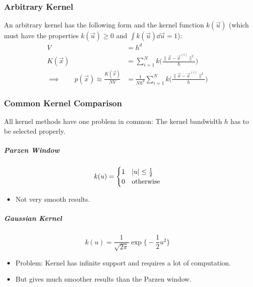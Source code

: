 \subsubsection{Arbitrary Kernel}
	An arbitrary kernel has the following form and the kernel function \( k(\vec{u}) \) (which must have the properties \( k(\vec{u}) \geq 0 \) and \( \int k(\vec{u}) \dd{\vec{u}} = 1 \)):
	\begin{align}
		V                                                       & = h^d                                                                                              \\
		K(\vec{x})                                              & = \sum_{i = 1}^{N} k\Bigg( \frac{\lVert \vec{x} - \vec{x}^{(i)} \rVert^2}{h} \Bigg)                \\
		\implies\qquad p(\vec{x}) \approx \frac{K(\vec{x})}{NV} & = \frac{1}{Nh^d} \sum_{i = 1}^{N} k\Bigg( \frac{\lVert \vec{x} - \vec{x}^{(i)} \rVert^2}{h} \Bigg)
	\end{align}

\subsubsection{Common Kernel Comparison}
	All kernel methods have one problem in common: The kernel bandwidth \(h\) has to be selected properly.

	\subparagraph{Parzen Window}
		\begin{equation}
			k(u) =
			\begin{cases}
				1 & \abs{u} \leq \frac{1}{2} \\
				0 & \textrm{otherwise}
			\end{cases}
		\end{equation}
		\begin{itemize}
			\item Not very smooth results.
		\end{itemize}

		\subparagraph{Gaussian Kernel}
			\begin{equation}
				k(u) = \frac{1}{\sqrt{2\pi}} \exp\Bigg\{ -\frac{1}{2} u^2 \Bigg\}
			\end{equation}
			\begin{itemize}
				\item Problem: Kernel has infinite support and requires a lot of computation.
				\item But gives much smoother results than the Parzen window.
			\end{itemize}

